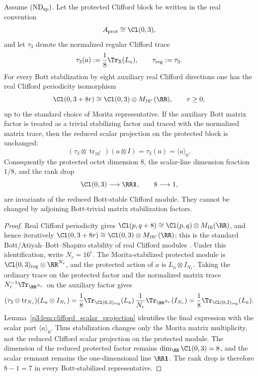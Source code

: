 \documentclass[11pt,a4paper]{article}
\begin{document}
\begin{theorem}
\label{p3:thm:bott-stable-protected-octet}
Assume \((\mathrm{ND}_{\rm sp})\).  Let the protected Clifford block be
written in the real convention
\[
A_{\rm prot}\cong\Cl(0,3),
\]
and let \(\tau_3\) denote the normalized regular Clifford trace
\[
\tau_3(a):=\frac{1}{8}\Tr_{\mathbb R}(L_a),
\qquad \tau_{\rm reg}:=\tau_3.
\]
For every Bott stabilization by eight auxiliary real Clifford directions one
has the real Clifford periodicity isomorphism
\[
\Cl(0,3+8r)\cong \Cl(0,3)\otimes M_{16^r}(\RR),
\qquad r\ge 0,
\]
up to the standard choice of Morita representative.  If the auxiliary Bott
matrix factor is treated as a trivial stabilizing factor and traced with the
normalized matrix trace, then the reduced scalar projection on the protected
block is unchanged:
\[
(\tau_3\otimes \operatorname{tr}_{16^r})(a\otimes I)
=\tau_3(a)=\langle a\rangle_0.
\]
Consequently the protected octet dimension \(8\), the scalar-line dimension
fraction \(1/8\), and the rank drop
\[
\Cl(0,3)\longrightarrow \RR\mathbf 1,
\qquad
8\longrightarrow 1,
\]
are invariants of the reduced Bott-stable Clifford module.  They cannot be
changed by adjoining Bott-trivial matrix stabilization factors.
\end{theorem}

\begin{proof}
Real Clifford periodicity gives
\(\Cl(p,q+8)\cong\Cl(p,q)\otimes M_{16}(\RR)\), and hence iteratively
\(\Cl(0,3+8r)\cong\Cl(0,3)\otimes M_{16^r}(\RR)\); this is the standard
Bott/Atiyah--Bott--Shapiro stability of real Clifford modules
\cite{abs,lawson1989spin}.  Under this identification, write \(N_r=16^r\).
The Morita-stabilized protected module is
\(\Cl(0,3)_{\rm reg}\otimes\RR^{N_r}\), and the protected action of \(a\) is
\(L_a\otimes I_{N_r}\).  Taking the ordinary trace on the protected factor
and the normalized matrix trace \(N_r^{-1}\Tr_{\RR^{N_r}}\) on the auxiliary
factor gives
\[
(\tau_3\otimes \operatorname{tr}_{N_r})(L_a\otimes I_{N_r})
=
\frac{1}{8}\Tr_{\Cl(0,3)_{\rm reg}}(L_a)\,
\frac{1}{N_r}\Tr_{\RR^{N_r}}(I_{N_r})
=
\frac{1}{8}\Tr_{\Cl(0,3)_{\rm reg}}(L_a).
\]
Lemma~\ref{p3:lem:clifford_scalar_projection} identifies the final expression
with the scalar part \(\langle a\rangle_0\).  Thus stabilization changes only
the Morita matrix multiplicity, not the reduced Clifford scalar projection on
the protected module.  The dimension of the reduced protected factor remains
\(\dim_{\RR}\Cl(0,3)=8\), and the scalar remnant remains the one-dimensional
line \(\RR\mathbf 1\).  The rank drop is therefore \(8-1=7\) in every
Bott-stabilized representative.
\end{proof}
\end{document}
